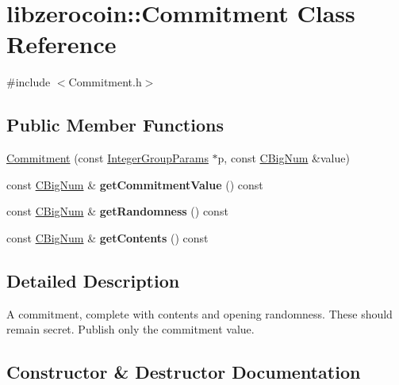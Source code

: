 \hypertarget{classlibzerocoin_1_1_commitment}{}\section{libzerocoin\+:\+:Commitment Class Reference}
\label{classlibzerocoin_1_1_commitment}


{\ttfamily \#include $<$Commitment.\+h$>$}

\subsection*{Public Member Functions}
\begin{DoxyCompactItemize}
\item 
\mbox{\hyperlink{classlibzerocoin_1_1_commitment_a009eaae23946cf89430297c9f676ec3e}{Commitment}} (const \mbox{\hyperlink{classlibzerocoin_1_1_integer_group_params}{Integer\+Group\+Params}} $\ast$p, const \mbox{\hyperlink{class_c_big_num}{C\+Big\+Num}} \&value)
\item 
\mbox{\label{classlibzerocoin_1_1_commitment_a512ade1b225b10f92f71b3c05869c23a}} 
const \mbox{\hyperlink{class_c_big_num}{C\+Big\+Num}} \& {\bfseries get\+Commitment\+Value} () const
\item 
\mbox{\label{classlibzerocoin_1_1_commitment_ac84eccbba59e5c0cb76ee8fd827d80de}} 
const \mbox{\hyperlink{class_c_big_num}{C\+Big\+Num}} \& {\bfseries get\+Randomness} () const
\item 
\mbox{\label{classlibzerocoin_1_1_commitment_acde85382375c1ded6b51612903cd1ac7}} 
const \mbox{\hyperlink{class_c_big_num}{C\+Big\+Num}} \& {\bfseries get\+Contents} () const
\end{DoxyCompactItemize}


\subsection{Detailed Description}
A commitment, complete with contents and opening randomness. These should remain secret. Publish only the commitment value. 

\subsection{Constructor \& Destructor Documentation}
\mbox{\label{classlibzerocoin_1_1_commitment_a009eaae23946cf89430297c9f676ec3e}} 
